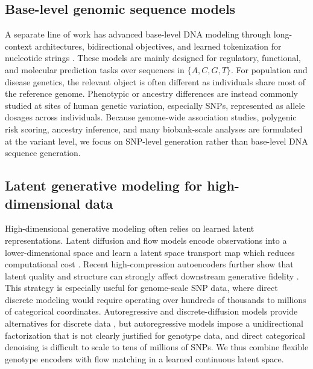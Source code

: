 \documentclass{article}
\begin{document}
\subsection{Base-level genomic sequence models}

A separate line of work has advanced base-level DNA modeling through long-context architectures, bidirectional objectives, and learned tokenization for nucleotide strings \cite{duan2025janusdna, zhou2023dnabert, dalla2025nucleotide, nguyen2023hyenadna}. These models are mainly designed for regulatory, functional, and molecular prediction tasks over sequences in \(\{A,C,G,T\}\). For population and disease genetics, the relevant object is often different as individuals share most of the reference genome. Phenotypic or ancestry differences are instead commonly studied at sites of human genetic variation, especially SNPs, represented as allele dosages across individuals. Because genome-wide association studies, polygenic risk scoring, ancestry inference, and many biobank-scale analyses are formulated at the variant level, we focus on SNP-level generation rather than base-level DNA sequence generation.



\subsection{Latent generative modeling for high-dimensional data}

High-dimensional generative modeling often relies on learned latent representations. Latent diffusion and flow models encode observations into a lower-dimensional space and learn a latent space transport map which reduces computational cost \cite{rombach2022high, vahdat2021score}. Recent high-compression autoencoders further show that latent quality and structure can strongly affect downstream generative fidelity \cite{chen2024deep, chen2025dc}. This strategy is especially useful for genome-scale SNP data, where direct discrete modeling would require operating over hundreds of thousands to millions of categorical coordinates. Autoregressive and discrete-diffusion models provide alternatives for discrete data \cite{van2016pixel,hoogeboom2021argmax,austin2021structured}, but autoregressive models impose a unidirectional factorization that is not clearly justified for genotype data, and direct categorical denoising is difficult to scale to tens of millions of SNPs. We thus combine flexible genotype encoders with flow matching in a learned continuous latent space.
\end{document}

